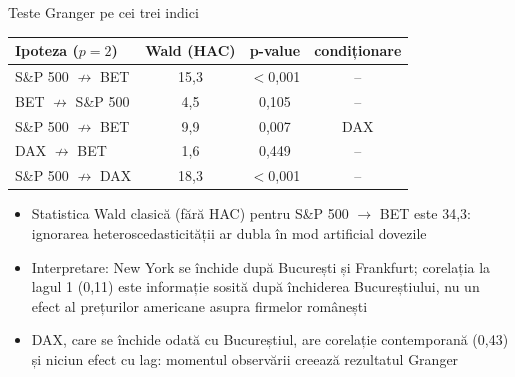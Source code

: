 \begin{frame}{Teste Granger pe cei trei indici}
\itemsize{\small}
\begin{center}
\footnotesize
\begin{tabular}{lccc}
\toprule
\textbf{Ipoteza} ($p = 2$) & \textbf{Wald (HAC)} & \textbf{p-value} & \textbf{condiționare} \\
\midrule
S\&P 500 $\not\to$ BET & 15{,}3 & $<$0{,}001 & -- \\
BET $\not\to$ S\&P 500 & 4{,}5 & 0{,}105 & -- \\
S\&P 500 $\not\to$ BET & 9{,}9 & 0{,}007 & DAX \\
DAX $\not\to$ BET & 1{,}6 & 0{,}449 & -- \\
S\&P 500 $\not\to$ DAX & 18{,}3 & $<$0{,}001 & -- \\
\bottomrule
\end{tabular}
\end{center}
\begin{itemize}
    \item Statistica Wald clasică (fără HAC) pentru S\&P 500 $\to$ BET este 34{,}3: ignorarea heteroscedasticității ar dubla în mod artificial dovezile
    \item Interpretare: New York se închide după București și Frankfurt; corelația la lagul 1 (0{,}11) este informație sosită după închiderea Bucureștiului, nu un efect al prețurilor americane asupra firmelor românești
    \item DAX, care se închide odată cu Bucureștiul, are corelație contemporană (0{,}43) și niciun efect cu lag: momentul observării creează rezultatul Granger
\end{itemize}
\end{frame}


